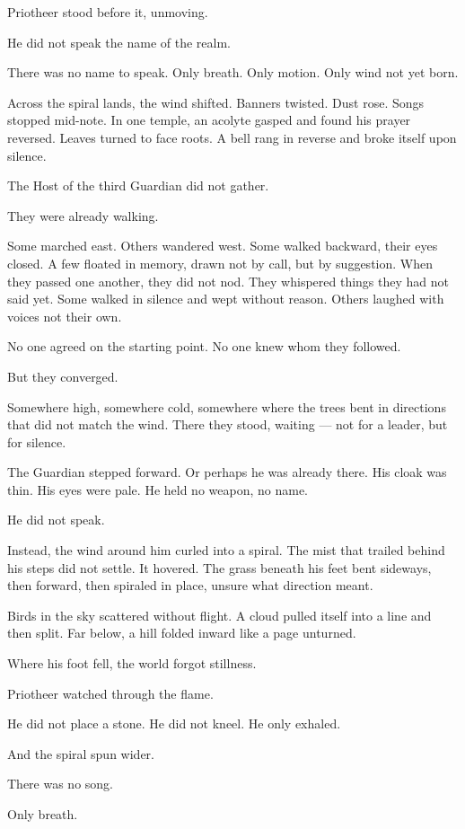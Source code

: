 \documentclass[12pt]{article}
\begin{document}
Priotheer stood before it, unmoving.

He did not speak the name of the realm.

There was no name to speak. Only breath. Only motion. Only wind not yet born.

Across the spiral lands, the wind shifted. Banners twisted. Dust rose. Songs stopped mid-note. In one temple, an acolyte gasped and found his prayer reversed. Leaves turned to face roots. A bell rang in reverse and broke itself upon silence.

The Host of the third Guardian did not gather.

They were already walking.

Some marched east. Others wandered west. Some walked backward, their eyes closed. A few floated in memory, drawn not by call, but by suggestion. When they passed one another, they did not nod. They whispered things they had not said yet. Some walked in silence and wept without reason. Others laughed with voices not their own.

No one agreed on the starting point. No one knew whom they followed.

But they converged.

Somewhere high, somewhere cold, somewhere where the trees bent in directions that did not match the wind. There they stood, waiting — not for a leader, but for silence.

The Guardian stepped forward. Or perhaps he was already there. His cloak was thin. His eyes were pale. He held no weapon, no name.

He did not speak.

Instead, the wind around him curled into a spiral. The mist that trailed behind his steps did not settle. It hovered. The grass beneath his feet bent sideways, then forward, then spiraled in place, unsure what direction meant.

Birds in the sky scattered without flight. A cloud pulled itself into a line and then split. Far below, a hill folded inward like a page unturned.

Where his foot fell, the world forgot stillness.

Priotheer watched through the flame.

He did not place a stone. He did not kneel. He only exhaled.

And the spiral spun wider.

There was no song.

Only breath.
\end{document}
